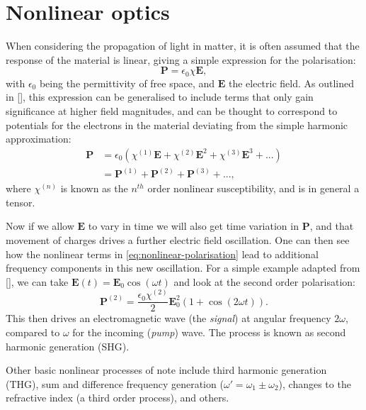 \documentclass[12pt,a4paper]{article}
\newcommand{\citein}[1]{[\citen{#1}]}
\begin{document}
\section{Nonlinear optics}
When considering the propagation of light in matter, it is often assumed that the response of the material is linear\cite{jacksonClassicalElectrodynamics1999}, giving a simple expression for the polarisation:
\begin{equation}
	\label{eq:linear-polarisation}
	\bm{P}=\epsilon_0\chi\bm{E},
\end{equation}
with $\epsilon_0$ being the permittivity of free space, and $\bm{E}$ the electric field. As outlined in \citein{boydNonlinearOptics2008}, this expression can be generalised to include terms that only gain significance at higher field magnitudes, and can be thought to correspond to potentials for the electrons in the material deviating from the simple harmonic approximation:
\begin{align}
	\label{eq:nonlinear-polarisation}
	\bm{P}&=\epsilon_0(\chi^{(1)}\bm{E}+\chi^{(2)}\bm{E}^2+\chi^{(3)}\bm{E}^3+...)\\
	&=\bm{P}^{(1)}+\bm{P}^{(2)}+\bm{P}^{(3)}+...,
\end{align}
where $\chi^{(n)}$ is known as the $n^{th}$ order nonlinear susceptibility, and is in general a tensor.

Now if we allow $\bm{E}$ to vary in time we will also get time variation in $\bm{P}$, and that movement of charges drives a further electric field oscillation. One can then see how the nonlinear terms in \eqref{eq:nonlinear-polarisation} lead to additional frequency components in this new oscillation. For a simple example adapted from \citein{boydNonlinearOptics2008}, we can take $\bm{E}(t)=\bm{E}_0\cos(\omega t)$ and look at the second order polarisation:
\begin{equation}
	\label{eq:example-polarisation}
	\bm{P}^{(2)}=\frac{\epsilon_0\chi^{(2)}}{2}\bm{E}_0^2\left(1+\cos(2\omega t)\right).
\end{equation}
This then drives an electromagnetic wave (the \emph{signal}) at angular frequency $2\omega$, compared to $\omega$ for the incoming (\emph{pump}) wave. The process is known as second harmonic generation (SHG).

Other basic nonlinear processes of note include third harmonic generation (THG), sum and difference frequency generation ($\omega'=\omega_1\pm\omega_2$), changes to the refractive index (a third order process), and others\cite{boydNonlinearOptics2008}.
\end{document}
